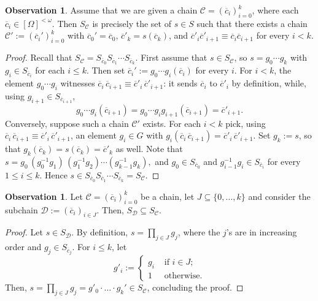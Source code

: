 \documentclass{article}
\theoremstyle{remark}
\theoremstyle{definition}
\newtheorem{observation}[theorem]{Observation}
\newcommand{\nn}[0]{S}%
\newcommand{\C}[0]{\mathcal{C}}
\newcommand{\D}[0]{\mathcal{D}}
\newcommand{\fps}[1]{[#1]^{<\omega}}
\newcommand{\orq}[0]{\equiv}
\renewcommand\leq{\leqslant}
\begin{document}
{{{{{  \begin{observation}
	   \label{o:chain} Assume that we are given a chain $\C=(\overline{c}_{i})_{i=0}^{k}$, where each $\overline{c}_{i}\in\fps{\Omega}$. Then  $\nn_{\mathcal{C}}$ is precisely the set of $s\in S$ such that there exists a chain %
       ${\mathcal{C}'}:=(\overline{c}_{i}')_{i=0}^{k}$ with $\overline{c}_0'=\overline{c}_0$, $\overline{c}'_{k}=s(\overline{c}_{k})$, and $\overline{c}'_{i}\overline{c}'_{i+1}\orq \overline{c}_{i}\overline{c}_{i+1}$ for every $i<k$.  
  \end{observation}
  \begin{proof}
  Recall that $\nn_{\C} = \nn_{\overline{c}_0}\nn_{\overline{c}_1}\cdots\nn_{\overline{c}_k}$. First assume that $s\in \nn_{\C}$, so $s=g_0\cdots g_k$ with $g_i\in \nn_{\overline{c}_i}$ for each %
  {$i\leq k$.}
  Then set $\overline{c}_i':=g_0\cdots g_i(\overline{c}_i)$ for every $i$. 
  For $i < k$, the element $g_0 \cdots g_i$ witnesses
  $\overline{c}_i\,\overline{c}_{i+1} \orq \overline{c}'_i\,\overline{c}'_{i+1}$: it sends
  $\overline{c}_i$ to $\overline{c}'_i$ by definition, while, using $g_{i+1} \in \nn_{\overline{c}_{i+1}}$, \begin{equation*}
    g_0 \cdots g_i(\overline{c}_{i+1})
      = g_0 \cdots g_i g_{i+1}(\overline{c}_{i+1})
      = \overline{c}'_{i+1}.
  \end{equation*}
Conversely, suppose such a chain 
${\mathcal{C}'}$ exists. For each $i < k$ pick,
  using $\overline{c}_i\,\overline{c}_{i+1} \orq \overline{c}'_i\,\overline{c}'_{i+1}$, an element
  {$g_i \in G$}
  with $g_i(\overline{c}_i\,\overline{c}_{i+1}) = \overline{c}'_i\,\overline{c}'_{i+1}$.
  Set $g_k := s$, so that $g_k(\overline{c}_k) = s(\overline{c}_k) = \overline{c}'_k$ as well. Note that $    s = g_0 \,(g_0^{-1}g_1)\,(g_1^{-1}g_2)\cdots(g_{k-1}^{-1}g_k),
$ and  $g_0 \in \nn_{\overline{c}_0}$ and  $g_{i-1}^{-1}g_i\in \nn_{\overline{c}_i}$ for every $1\leq i\leq k$.  Hence
  $s \in \nn_{\overline{c}_0}\nn_{\overline{c}_1}\cdots\nn_{\overline{c}_k} = \nn_{\C}$.
  

  \end{proof}
  
\begin{observation}\label{obs: subchains}
 Let $\C=(\overline{c}_i)_{i=0}^k$ be a chain, let $J\subseteq \{0, \dots, k\}$ and consider the subchain $\D:=(\overline{c}_i)_{i\in J}$. Then, $\nn_{\D}\subseteq\nn_{\C}$.

\end{observation}
\begin{proof} %
Let $s\in\nn_{\D}$. By definition, $s=\prod_{j\in J} g_j$, {where the $j$'s are in increasing order and} %
$g_j\in\nn_{\overline{c}_j}$. For $i\leq k$, let
\[g'_i:=\begin{cases} g_i &\text{ if } i\in J;\\
1 &\text{ otherwise.}
\end{cases}\]
Then, $s=\prod_{j\in J} g_j=g'_0\cdot \dots \cdot g_k'\in \nn_{\C}$,
concluding the proof. 
\end{proof}


}}}}}
\end{document}
